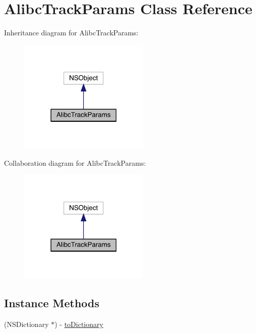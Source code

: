 \hypertarget{interface_alibc_track_params}{}\section{Alibc\+Track\+Params Class Reference}
\label{interface_alibc_track_params}


Inheritance diagram for Alibc\+Track\+Params\+:\nopagebreak
\begin{figure}[H]
\begin{center}
\leavevmode
\includegraphics[width=177pt]{interface_alibc_track_params__inherit__graph}
\end{center}
\end{figure}


Collaboration diagram for Alibc\+Track\+Params\+:\nopagebreak
\begin{figure}[H]
\begin{center}
\leavevmode
\includegraphics[width=177pt]{interface_alibc_track_params__coll__graph}
\end{center}
\end{figure}
\subsection*{Instance Methods}
\begin{DoxyCompactItemize}
\item 
(N\+S\+Dictionary $\ast$) -\/ \mbox{\hyperlink{interface_alibc_track_params_ad9b3d9ebe3f600c74a12d477f97170de}{to\+Dictionary}}
\end{DoxyCompactItemize}
